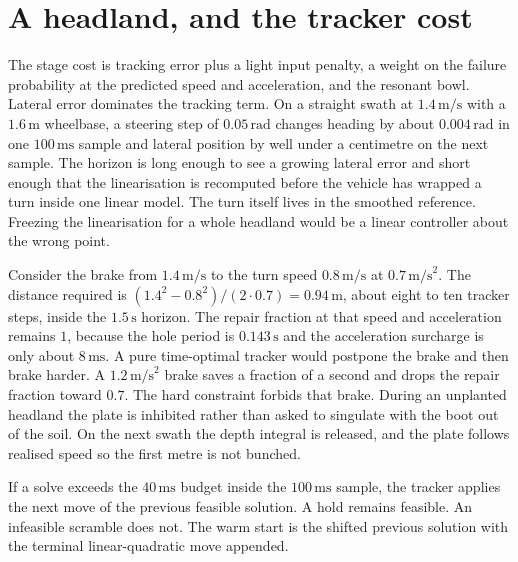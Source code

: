 \documentclass[11pt,a4paper]{article}
\begin{document}
\section{A headland, and the tracker cost}
The stage cost is tracking error plus a light input penalty, a weight on the failure probability at the predicted speed and acceleration, and the resonant bowl. Lateral error dominates the tracking term. On a straight swath at \(1.4\,\mathrm{m/s}\) with a \(1.6\,\mathrm{m}\) wheelbase, a steering step of \(0.05\,\mathrm{rad}\) changes heading by about \(0.004\,\mathrm{rad}\) in one \(100\,\mathrm{ms}\) sample and lateral position by well under a centimetre on the next sample. The horizon is long enough to see a growing lateral error and short enough that the linearisation is recomputed before the vehicle has wrapped a turn inside one linear model. The turn itself lives in the smoothed reference. Freezing the linearisation for a whole headland would be a linear controller about the wrong point.

Consider the brake from \(1.4\,\mathrm{m/s}\) to the turn speed \(0.8\,\mathrm{m/s}\) at \(0.7\,\mathrm{m/s}^2\). The distance required is \((1.4^2-0.8^2)/(2\cdot 0.7)=0.94\,\mathrm{m}\), about eight to ten tracker steps, inside the \(1.5\,\mathrm{s}\) horizon. The repair fraction at that speed and acceleration remains \(1\), because the hole period is \(0.143\,\mathrm{s}\) and the acceleration surcharge is only about \(8\,\mathrm{ms}\). A pure time-optimal tracker would postpone the brake and then brake harder. A \(1.2\,\mathrm{m/s}^2\) brake saves a fraction of a second and drops the repair fraction toward \(0.7\). The hard constraint forbids that brake. During an unplanted headland the plate is inhibited rather than asked to singulate with the boot out of the soil. On the next swath the depth integral is released, and the plate follows realised speed so the first metre is not bunched.

If a solve exceeds the \(40\,\mathrm{ms}\) budget inside the \(100\,\mathrm{ms}\) sample, the tracker applies the next move of the previous feasible solution. A hold remains feasible. An infeasible scramble does not. The warm start is the shifted previous solution with the terminal linear-quadratic move appended.
\end{document}
